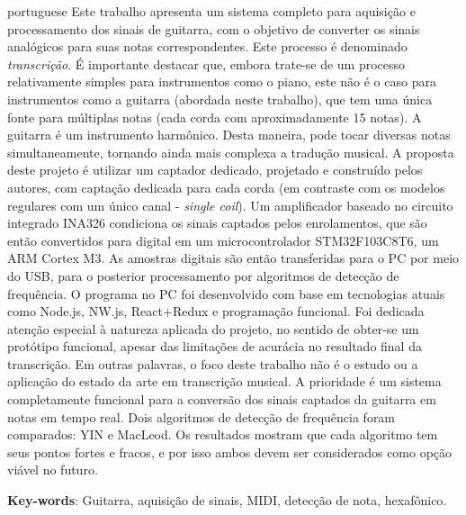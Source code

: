 \begin{summary}[Resumo]
 \begin{otherlanguage*}{portuguese}
    Este trabalho apresenta um sistema completo para aquisição e processamento dos sinais de guitarra,
    com o objetivo de converter os sinais analógicos para suas notas correspondentes. Este processo é denominado \emph{transcrição}. 
    É importante destacar que, embora trate-se de um processo relativamente simples para instrumentos
    como o piano, este não é o caso para instrumentos como a guitarra (abordada neste trabalho), que tem
    uma única fonte para múltiplas notas (cada corda com aproximadamente 15 notas). A guitarra é um instrumento
    harmônico. Desta maneira, pode tocar diversas notas simultaneamente, tornando ainda mais complexa a tradução
    musical. A proposta deste projeto é utilizar um captador dedicado, projetado e construído pelos autores,
    com captação dedicada para cada corda (em contraste com os modelos regulares com um único canal - \emph{single coil}).
    Um amplificador baseado no circuito integrado INA326 condiciona os sinais captados pelos enrolamentos, que são
    então convertidos para digital em um microcontrolador STM32F103C8T6,
    um ARM Cortex M3. As amostras digitais são então transferidas para o PC por meio do USB, para o posterior processamento
    por algoritmos de detecção de frequência.  O programa no PC foi desenvolvido com base em tecnologias atuais como Node.js, NW.js, React+Redux e
    programação funcional. Foi dedicada atenção especial à natureza aplicada do projeto, no sentido de obter-se
    um protótipo funcional, apesar das limitações de acurácia no resultado final da transcrição. Em outras palavras, 
    o foco deste trabalho não é o estudo ou a aplicação do estado da arte em transcrição musical. A prioridade é um sistema completamente funcional
    para a conversão dos sinais captados da guitarra em notas em tempo real. Dois algoritmos de detecção
    de frequência foram comparados: YIN e MacLeod. Os resultados mostram que cada algoritmo tem seus pontos
    fortes e fracos, e por isso ambos devem ser considerados como opção viável no futuro.
  
  
    \textbf{Key-words}: Guitarra, aquisição de sinais, MIDI, detecção de nota, hexafônico.
  \end{otherlanguage*}
\end{summary}

